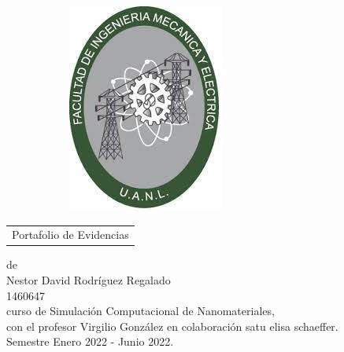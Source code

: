 \documentclass[letterpaper, 10 pt, conference]{article}
\begin{document}
\begin{scshape}
\begin{center}
\begin{figure}[h!]
\begin{subfigure}{0.2\linewidth}
			\includegraphics[width=\linewidth]{fime}
		\end{subfigure}
	\end{figure}
	\vskip16mm
	\begin{tabular}{p{11cm}}
		\centering
		{\large Portafolio de Evidencias}
	\end{tabular}
	\vskip7mm
	{de}\\[7mm]
	{\large Nestor David Rodríguez Regalado}\\[3mm]
	{1460647}\\[7 mm]
	{curso de Simulación Computacional de Nanomateriales,}\\[3mm]
	{con el profesor Virgilio González en colaboración satu elisa schaeffer.}\\[3mm]
	Semestre Enero 2022 - Junio 2022. \\ [5 mm]
	\begin{table}[ht]
\centering


\end{table}
\end{center}
\end{scshape}
\end{document}
